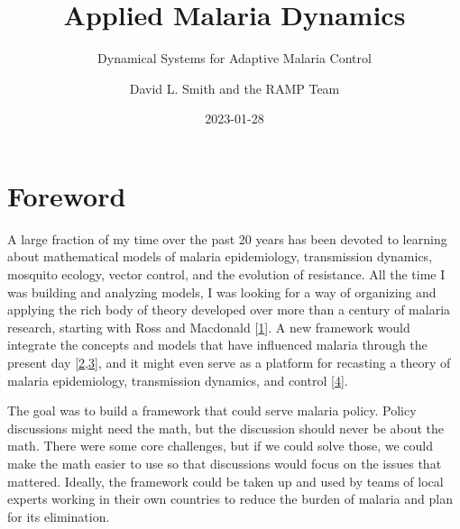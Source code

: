 \documentclass[
]{book}
\title{Applied Malaria Dynamics}
\subtitle{Dynamical Systems for Adaptive Malaria Control}
\author{David L. Smith and the RAMP Team}
\date{2023-01-28}
\begin{document}
\maketitle

{
\setcounter{tocdepth}{2}
\tableofcontents
}
\hypertarget{foreword}{%
\chapter*{Foreword}\label{foreword}}

A large fraction of my time over the past 20 years has been devoted to learning about mathematical models of malaria epidemiology, transmission dynamics, mosquito ecology, vector control, and the evolution of resistance. All the time I was building and analyzing models, I was looking for a way of organizing and applying the rich body of theory developed over more than a century of malaria research, starting with Ross and Macdonald {[}\protect\hyperlink{ref-SmithDL2012_RossMacdonald}{1}{]}.
A new framework would integrate the concepts and models that have influenced malaria through the present day {[}\protect\hyperlink{ref-ReinerRCJ2013SystematicReview}{2},\protect\hyperlink{ref-SmithNR2018AgentbasedModels}{3}{]}, and it might even serve as a platform for recasting a theory of malaria epidemiology, transmission dynamics, and control {[}\protect\hyperlink{ref-SmithDL2014_Recasting}{4}{]}.

The goal was to build a framework that could serve malaria policy. Policy discussions might need the math, but the discussion should never be about the math. There were some core challenges, but if we could solve those, we could make the math easier to use so that discussions would focus on the issues that mattered. Ideally, the framework could be taken up and used by teams of local experts working in their own countries to reduce the burden of malaria and plan for its elimination.
\end{document}
